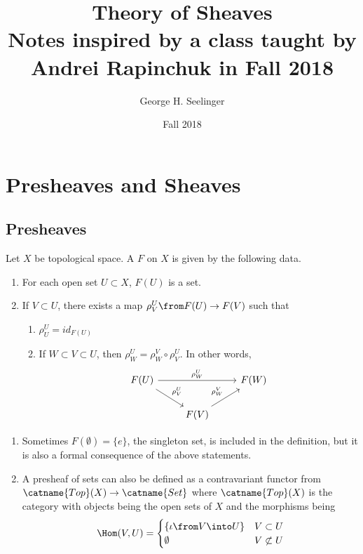 \documentclass[11pt,leqno,oneside]{amsbook}
\title[Theory of Sheaves]{Theory of Sheaves \\ Notes
  inspired by a class taught by Andrei Rapinchuk in Fall 2018}
\author{George H. Seelinger}
\date{Fall 2018}
\renewcommand{\F}{F} %
\numberwithin{thm}{section}
\begin{document}
\maketitle
\section{Presheaves and Sheaves}
\subsection{Presheaves}
\begin{defn}
  Let \(X\) be topological space. A  \(\F\) on
  \(X\) is given by the following data.
  \begin{enumerate}
  \item For each open set \(U \subset X\), \(\F(U)\) is a set.
  \item If \(V \subset U\), there exists a map \(\rho^U_V \from \F(U)
    \to \F(V)\) such that
    \begin{enumerate}
    \item \(\rho_U^U = id_{\F(U)}\)
    \item If \(W \subset V \subset U\), then \(\rho_W^U = \rho_W^V
      \circ \rho_V^U\). In other words, \[
        \begin{tikzcd}
          \F(U) \ar[rd, "\rho_V^U"] \ar[rr, "\rho_W^U"] & & \F(W)\\
          & \F(V) \ar[ur, "\rho_W^V"]&
        \end{tikzcd}
      \]
    \end{enumerate}
  \end{enumerate}
\end{defn}
\begin{rmk}
  \begin{enumerate}
  \item Sometimes \(\F(\emptyset) = \{e\}\), the singleton set, is
    included in the 
    definition, but it is also a formal consequence of the above
    statements.
  \item A presheaf of sets can also be defined as a contravariant
    functor from \(\catname{Top}(X) \to \catname{Set}\) where
    \(\catname{Top}(X)\) is the category with objects being the open
    sets of \(X\) and the morphisms being \[
      \Hom(V,U) =
      \begin{cases}
        \{\iota \from V \into U\} & V \subset U\\
        \emptyset & V \not\subset U
      \end{cases}
    \]
  \end{enumerate}
\end{rmk}
\end{document}
